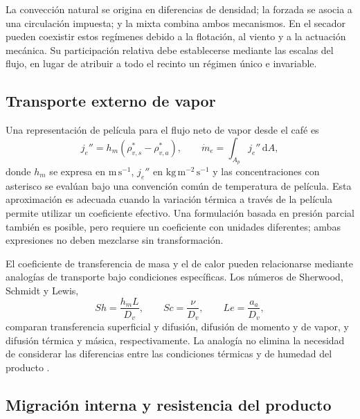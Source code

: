 La convección natural se origina en diferencias de densidad; la forzada se asocia a una circulación impuesta; y la mixta combina ambos mecanismos. En el secador pueden coexistir estos regímenes debido a la flotación, al viento y a la actuación mecánica. Su participación relativa debe establecerse mediante las escalas del flujo, en lugar de atribuir a todo el recinto un régimen único e invariable.

\subsection{Transporte externo de vapor}

Una representación de película para el flujo neto de vapor desde el café es
\begin{equation}
j_e''=h_m\left(\rho_{v,s}^{*}-\rho_{v,a}^{*}\right),
\qquad
\dot m_e=\int_{A_p}j_e''\,\mathrm{d}A,
\label{eq:flujo_evaporacion}
\end{equation}
donde $h_m$ se expresa en $\mathrm{m\,s^{-1}}$, $j_e''$ en $\mathrm{kg\,m^{-2}\,s^{-1}}$ y las concentraciones con asterisco se evalúan bajo una convención común de temperatura de película. Esta aproximación es adecuada cuando la variación térmica a través de la película permite utilizar un coeficiente efectivo. Una formulación basada en presión parcial también es posible, pero requiere un coeficiente con unidades diferentes; ambas expresiones no deben mezclarse sin transformación.

El coeficiente de transferencia de masa y el de calor pueden relacionarse mediante analogías de transporte bajo condiciones específicas. Los números de Sherwood, Schmidt y Lewis,
\begin{equation}
Sh=\frac{h_m L}{D_v},
\qquad
Sc=\frac{\nu}{D_v},
\qquad
Le=\frac{a_a}{D_v},
\label{eq:adimensionales_masa}
\end{equation}
comparan transferencia superficial y difusión, difusión de momento y de vapor, y difusión térmica y másica, respectivamente. La analogía no elimina la necesidad de considerar las diferencias entre las condiciones térmicas y de humedad del producto \cite{bergman2017}.

\subsection{Migración interna y resistencia del producto}

